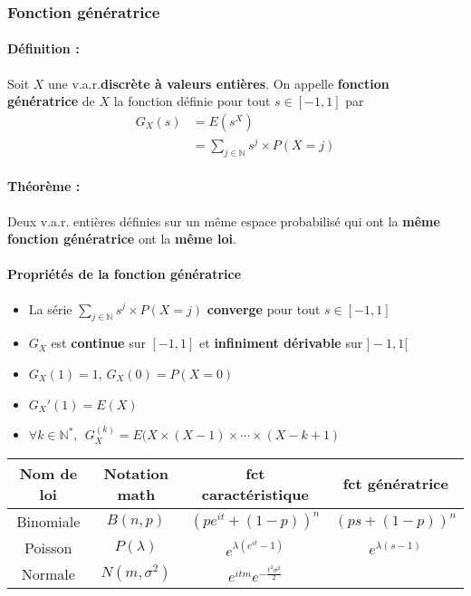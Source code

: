 \documentclass[10pt,a4paper,twoside]{article}
\begin{document}
\subsubsection{Fonction génératrice}
\paragraph{Définition :} Soit $X$ une v.a.r.\textbf{discrète à valeurs entières}. On appelle \textbf{fonction génératrice} de $X$ la fonction définie pour tout $s\in [-1,1]$ par
\begin{align*}
G_{X}(s) &= E(s^{X})\\
 &= \sum_{j\in \mathbb{N}}s^{j}\times P(X=j)
\end{align*}

\paragraph{Théorème :} Deux v.a.r. entières définies sur un même espace probabilisé qui ont la \textbf{même fonction génératrice} ont la \textbf{même loi}.

\paragraph{Propriétés de la fonction génératrice}
\begin{itemize}
\item La série $\sum_{j\in \mathbb{N}} s^{j}\times P(X=j)$ \textbf{converge} pour tout $s\in [-1,1]$
\item $G_{X}$ est \textbf{continue} sur $[-1,1]$ et \textbf{infiniment dérivable} sur $]-1,1[$
\item $G_{X}(1)=1$, $G_{X}(0)=P(X=0)$
\item $G_{X}'(1) = E(X)$
\item $\forall k \in \mathbb{N^{*}},\ \  G_{X}^{(k)} = E(X\times (X-1) \times \cdots \times (X-k+1)$
\end{itemize}

\renewcommand\arraystretch{1.75}
\begin{tabular}{cccc}

Nom de loi & Notation math & fct caractéristique & fct génératrice\\ 
\hline 
Binomiale & $B(n,p)$ & $(pe^{it}+(1-p))^{n}$ & $(ps+(1-p))^{n}$\\
Poisson & $P(\lambda)$ & $e^{\lambda(e^{it}-1)}$ & $e^{\lambda(s-1)}$\\
Normale & $N(m,\sigma^{2})$ & $e^{itm}e^{-\frac{t^{2}\sigma^{2}}{2}}$ & \\
\end{tabular} 
\renewcommand\arraystretch{1}
\end{document}
